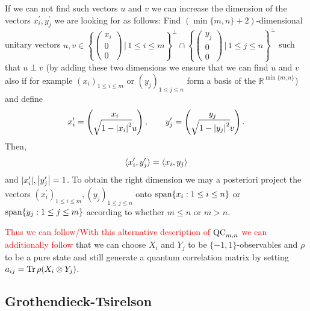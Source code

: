 	If we can not find such vectors $u$ and $v$ we can increase the dimension of the vectors $x_i^\prime,y_j^\prime$ we are looking for as follows: Find $(\min\{m,n\}+2)$-dimensional unitary vectors $u,v\in\left\{\begin{pmatrix} x_i \\ 0 \\ 0 \end{pmatrix} \,\bigg| \, 1\leq i \leq m\right\}^\perp \cap \left\{\begin{pmatrix} y_j \\ 0 \\ 0 \end{pmatrix}\,\bigg| \, 1\leq j \leq n\right\}^\perp$ such that $u\perp v$ (by adding these two dimensions we ensure that we can find $u$ and $v$ also if for example $(x_i)_{1\leq i \leq m}$ or $(y_j)_{1\leq j \leq n}$ form a basis of the $\mathbb{R}^{\min\{m,n\}}$) and define 
	\begin{align*}
		x_i^\prime = \begin{pmatrix}
			x_i \\ \sqrt{1-{\left|{x_i}\right|}^2}u
		\end{pmatrix},\qquad
		y_j^\prime = \begin{pmatrix}
			y_j \\ \sqrt{1-{\left|{y_j}\right|}^2}v
		\end{pmatrix}.
	\end{align*}
	Then,
	\begin{align*}
		\langle{x_i^\prime},{y_j^\prime}\rangle = \langle{x_i},{y_j}\rangle
	\end{align*}
	and ${\left|{x_i^\prime}\right|},{\left|{y_j^\prime}\right|}=1$.
	To obtain the right dimension we may a posteriori project the vectors $(x_i^\prime)_{1\leq i \leq m},(y_j)_{1\leq j \leq n}$ onto $\operatorname{span}\{x_i : 1\leq i \leq n\}$ or $\operatorname{span}\{y_j : 1\leq j \leq m\}$ according to whether $m\leq n$ or $m > n$.
	
	\textcolor{red}{Thus we can follow/With this alternative description of $\textup{QC}_{m,n}$ we can additionally follow} that we can choose $X_i$ and $Y_j$ to be $\{-1,1\}$-observables and $\rho$ to be a pure state and still generate a quantum correlation matrix by setting $a_{ij} = \textup{Tr} \, {\rho(X_i\otimes Y_j)} $.

\subsection{Grothendieck-Tsirelson}


